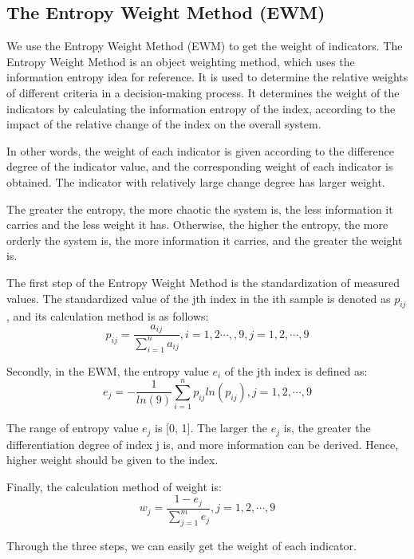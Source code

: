 \MinParskip{}

\subsection{The Entropy Weight Method (EWM) }
We use the Entropy Weight Method (EWM) to get the weight of indicators. The Entropy Weight Method is an object weighting method, which uses the information entropy idea for reference. It is used to determine the relative weights of different criteria in a decision-making process. It determines the weight of the indicators by calculating the information entropy of the index, according to the impact of the relative change of the index on the overall system.

In other words, the weight of each indicator is given according to the difference degree of the indicator value, and the corresponding weight of each indicator is obtained. The indicator with relatively large change degree has larger weight. 

The greater the entropy, the more chaotic the system is, the less information it carries and the less weight it has. Otherwise, the higher the entropy, the more orderly the system is, the more information it carries, and the greater the weight is.

The first step of the Entropy Weight Method is the standardization of measured values. The standardized value of the jth index in the ith sample is denoted as $p_{ij}$, and its calculation method is as follows:$$p_{ij}=\frac{a_{ij}}{\sum_{i=1}^na_{ij}},i=1,2\cdots,,9,j=1,2,\cdots,9$$

Secondly, in the EWM, the entropy value $e_i$ of the jth index is defined as:$$e_j=-\frac{1}{ln(9)}\sum_{i=1}^np_{ij}ln(p_{ij}),j=1,2,\cdots,9$$

The range of entropy value $e_j$ is [0, 1]. The larger the $e_j$ is, the greater the differentiation degree of index j is, and more information can be derived. Hence, higher weight should be given to the index. 

Finally, the calculation method of weight is:$$w_j=\frac{1-e_j}{\sum_{j=1}^me_j},j=1,2,\cdots,9$$

Through the three steps, we can easily get the weight of each indicator.

